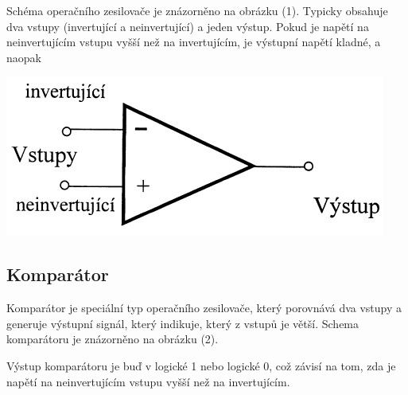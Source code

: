 \documentclass[a4paper,11pt]{article}
\begin{document}
    \begin{minipage}[t]{0.5\textwidth} 
                Schéma operačního zesilovače je znázorněno na obrázku (1). Typicky obsahuje dva vstupy (invertující a neinvertující) a jeden výstup. Pokud je napětí na neinvertujícím vstupu vyšší než na invertujícím, je výstupní napětí kladné, a naopak

                \vspace{10pt}   
                \par \centering
                \includegraphics[scale=0.6]{scheme}
                \captionsetup{justification=centering, font=footnotesize}
                \label{fig:scheme}
                \vspace{10pt}
                \raggedright   

            \subsection{Komparátor}
                Komparátor je speciální typ operačního zesilovače, který porovnává dva vstupy a generuje výstupní signál, který indikuje, který z vstupů je větší. Schema komparátoru je znázorněno na obrázku (2).
                \par Výstup komparátoru je buď v logické 1 nebo logické 0, což závisí na tom, zda je napětí na neinvertujícím vstupu vyšší než na invertujícím. 


\end{minipage}
\end{document}
